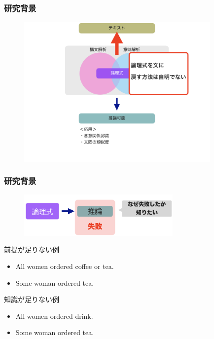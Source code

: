 \documentclass[dvipdfmx]{beamer}
\begin{document}
\begin{frame}
\frametitle{研究背景}
\begin{center}
\begin{figure}[h]
	\includegraphics[width=10cm]{backend2.png}
        \label{fig:backend2}
\end{figure}
\end{center}
\end{frame}

\begin{frame}
\frametitle{研究背景}
\begin{center}
\begin{figure}[h]
	\includegraphics[width=8cm]{backend4.png}
        \label{fig:backend4}
\end{figure}
\end{center}
\begin{block}{前提が足りない例}
  \begin{itemize}
    \item All women ordered coffee or tea.
    \item Some woman ordered tea.
  \end{itemize}
\end{block}
\begin{block}{知識が足りない例}
  \begin{itemize}
    \item All women ordered drink.
    \item Some woman ordered tea.
  \end{itemize}
\end{block}

\end{frame}
\end{document}
